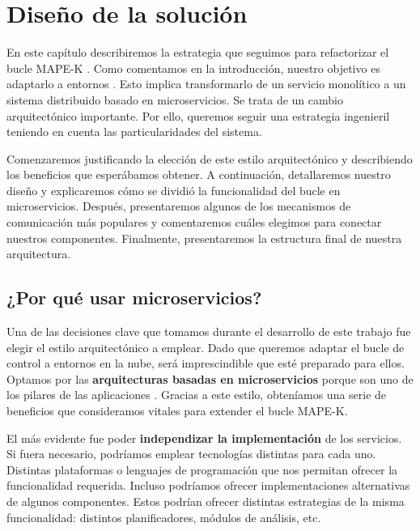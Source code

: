 \chapter{Diseño de la solución}
\label{chap:diseño}

En este capítulo describiremos la estrategia que seguimos para refactorizar el bucle MAPE-K . Como comentamos en la introducción, nuestro objetivo es adaptarlo a entornos . Esto implica transformarlo de un servicio monolítico a un sistema distribuido basado en microservicios. Se trata de un cambio arquitectónico importante. Por ello, queremos seguir una estrategia ingenieril teniendo en cuenta las particularidades del sistema.

Comenzaremos justificando la elección de este estilo arquitectónico y describiendo los beneficios que esperábamos obtener. A continuación, detallaremos nuestro diseño y explicaremos cómo se dividió la funcionalidad del bucle en microservicios. Después, presentaremos algunos de los mecanismos de comunicación más populares y comentaremos cuáles elegimos para conectar nuestros componentes. Finalmente, presentaremos la estructura final de nuestra arquitectura.

\section{¿Por qué usar microservicios?}
\label{sec:por-que-microservicios}

Una de las decisiones clave que tomamos durante el desarrollo de este trabajo fue elegir el estilo arquitectónico a emplear. Dado que queremos adaptar el bucle de control a entornos en la nube, será imprescindible que esté preparado para ellos. Optamos por las \textbf{arquitecturas basadas en microservicios} porque son uno de los pilares de las aplicaciones . \cite{gannonCloudNativeApplications2017} Gracias a este estilo, obteníamos una serie de beneficios que consideramos vitales para extender el bucle MAPE-K.

El más evidente fue poder \textbf{independizar la implementación} de los servicios. Si fuera necesario, podríamos emplear tecnologías distintas para cada uno. Distintas plataformas o lenguajes de programación que nos permitan ofrecer la funcionalidad requerida. Incluso podríamos ofrecer implementaciones alternativas de algunos componentes. Estos podrían ofrecer distintas estrategias de la misma funcionalidad: distintos planificadores, módulos de análisis, etc.

